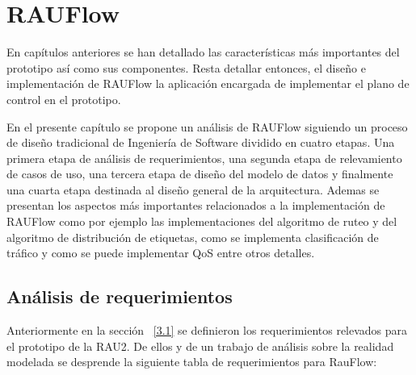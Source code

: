 \chapter{RAUFlow}
\label{Capítulo 5}

\ifpdf
    \graphicspath{{Chapter5/Figs/Raster/}{Chapter5/Figs/PDF/}{Chapter5/Figs/}}
\else
    \graphicspath{{Chapter5/Figs/Vector/}{Chapter5/Figs/}}
\fi

En cap\'itulos anteriores se han detallado las caracter\'isticas m\'as importantes del prototipo así como sus componentes. Resta detallar entonces, el dise\~no e implementaci\'on de RAUFlow la aplicaci\'on encargada de implementar el plano de control en el prototipo. 

En el presente cap\'itulo se propone un an\'alisis de RAUFlow siguiendo un proceso de dise\~no tradicional de Ingenier\'ia de Software dividido en cuatro etapas. Una primera etapa de an\'alisis de requerimientos, una segunda etapa de relevamiento de casos de uso, una tercera etapa de dise\~no del modelo de datos y finalmente una cuarta etapa destinada al dise\~no general de la arquitectura. Ademas se presentan los aspectos m\'as importantes relacionados a la implementaci\'on de RAUFlow como por ejemplo las implementaciones del algoritmo de ruteo y del algoritmo de distribución de etiquetas, como se implementa clasificaci\'on de tr\'afico y como se puede implementar QoS entre otros detalles. 

\section[An\'alisis de requerimientos]{An\'alisis de requerimientos}
\label{section5.1}

Anteriormente en la sección ~\ref{3.1} se definieron los requerimientos relevados para el prototipo de la RAU2. De ellos y de un trabajo de an\'alisis sobre la realidad modelada se desprende la siguiente tabla de requerimientos para RauFlow:

